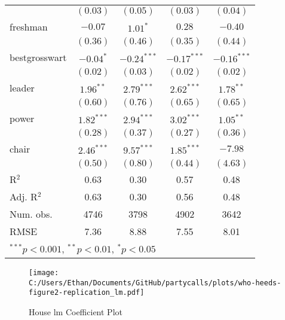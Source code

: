 \documentclass[12pt]{article}
\begin{document}
\begin{table}[ht]
\begin{center}
\begin{tabular}{l c c c c }
			& $(0.03)$      & $(0.05)$      & $(0.03)$      & $(0.04)$      \\
			freshman               & $-0.07$       & $1.01^{*}$    & $0.28$        & $-0.40$       \\
			& $(0.36)$      & $(0.46)$      & $(0.35)$      & $(0.44)$      \\
			bestgrosswart          & $-0.04^{*}$   & $-0.24^{***}$ & $-0.17^{***}$ & $-0.16^{***}$ \\
			& $(0.02)$      & $(0.03)$      & $(0.02)$      & $(0.02)$      \\
			leader                 & $1.96^{**}$   & $2.79^{***}$  & $2.62^{***}$  & $1.78^{**}$   \\
			& $(0.60)$      & $(0.76)$      & $(0.65)$      & $(0.65)$      \\
			power                  & $1.82^{***}$  & $2.94^{***}$  & $3.02^{***}$  & $1.05^{**}$   \\
			& $(0.28)$      & $(0.37)$      & $(0.27)$      & $(0.36)$      \\
			chair                  & $2.46^{***}$  & $9.57^{***}$  & $1.85^{***}$  & $-7.98$       \\
			& $(0.50)$      & $(0.80)$      & $(0.44)$      & $(4.63)$      \\
			\hline
			R$^2$                  & 0.63          & 0.30          & 0.57          & 0.48          \\
			Adj. R$^2$             & 0.63          & 0.30          & 0.56          & 0.48          \\
			Num. obs.              & 4746          & 3798          & 4902          & 3642          \\
			RMSE                   & 7.36          & 8.88          & 7.55          & 8.01          \\
			\hline
			\multicolumn{5}{l}{\scriptsize{$^{***}p<0.001$, $^{**}p<0.01$, $^*p<0.05$}}
		\end{tabular}
	\end{center}
\end{table}

\begin{figure}[h]
	\centering
	\caption{House lm Coefficient Plot}
	\texttt{[image: C:/Users/Ethan/Documents/GitHub/partycalls/plots/who-heeds-figure2-replication\_lm.pdf]}
\end{figure}
\end{document}
